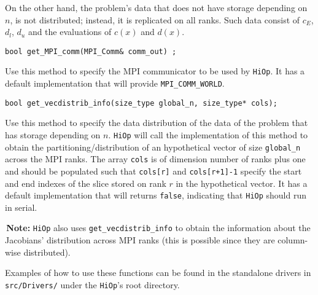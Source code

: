 \documentclass[11pt]{article}
\newcommand{\warningSymbol}{\raisebox{0.9\depth}{\danger}}
\newcommand{\warningcp}[1]{%
        \smallskip \noindent \textcolor{warningColorText}{\warningSymbol{}}\,\textbf{#1} %
    }
\newcommand{\Hi}{\texttt{HiOp}\xspace}
\begin{document}
On the other hand, the problem's data that does not have storage depending on $n$, is not distributed; instead, it is replicated on all ranks. Such data consist of $c_E$, $d_l$, $d_u$ and the evaluations of $c(x)$ and $d(x)$.
 
\begin{lstlisting} 
bool get_MPI_comm(MPI_Comm& comm_out) ;
\end{lstlisting}

\noindent Use this method to specify the MPI communicator to be used by \Hi. It has a default implementation that will provide \texttt{MPI\_COMM\_WORLD}.


\begin{lstlisting}
bool get_vecdistrib_info(size_type global_n, size_type* cols);
\end{lstlisting}

\noindent Use this method to specify the data distribution of the data of the problem that has storage depending on $n$. \Hi will call the implementation of this method to obtain the partitioning/distribution of an hypothetical vector of size \texttt{global\_n} across the MPI ranks. The array \texttt{cols} is of dimension number of ranks plus one and should be populated such that \texttt{cols[r]} and \texttt{cols[r+1]-1} specify the start and end indexes of the slice stored on rank $r$ in the hypothetical vector.  It has a default implementation that will returns \texttt{false}, indicating that \Hi should run in serial.


\warningcp{Note:}  \Hi also uses \texttt{get\_vecdistrib\_info} to obtain the information about the Jacobians' distribution across MPI ranks (this is possible since they are  column-wise distributed).

Examples of how to use these functions can be found in the standalone drivers in \texttt{src/Drivers/} under the \Hi's root directory.

\end{document}
